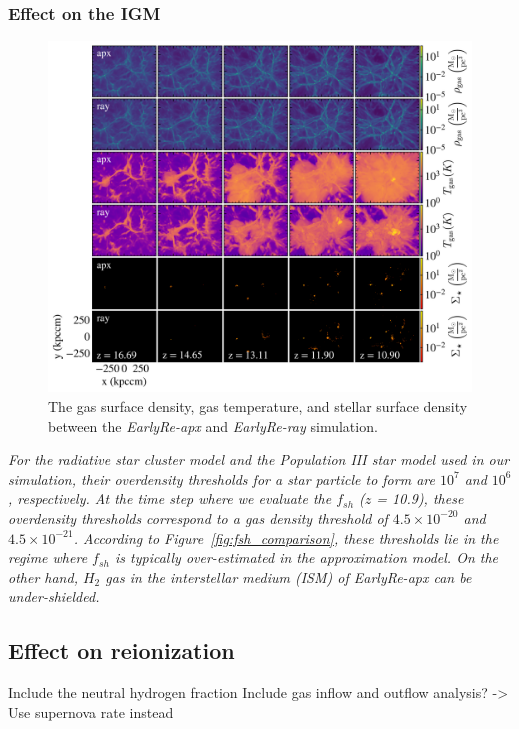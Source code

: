 \documentclass[linenumbers, twocolumn]{aastex631}
\begin{document}
\subsubsection{Effect on the IGM}

\begin{figure}
    \centering
    \includegraphics[width=\textwidth]{EarlyRe/gas_star_surface_density_multiple.png}
    \caption{The gas surface density, gas temperature, and stellar surface density between the \textit{EarlyRe-apx} and \textit{EarlyRe-ray} simulation.}
    \label{fig:gas_star_surface_density_194}
\end{figure}

\textit{For the radiative star cluster model and the Population III star model used in our simulation, their overdensity thresholds for a star particle to form are $10^{7}$ and $10^{6}$, respectively. At the time step where we evaluate the $f_{sh}$ ($z$ = 10.9), these overdensity thresholds correspond to a gas density threshold of $4.5\times 10^{-20}$ and $4.5\times 10^{-21}$. According to Figure~\ref{fig:fsh_comparison}, these thresholds lie in the regime where $f_{sh}$ is typically over-estimated in the approximation model. On the other hand, $H_{2}$ gas in the interstellar medium (ISM) of \textit{EarlyRe-apx} can be under-shielded.} 



\subsection{Effect on reionization}
Include the neutral hydrogen fraction 
Include gas inflow and outflow analysis? -> Use supernova rate instead
\end{document}
